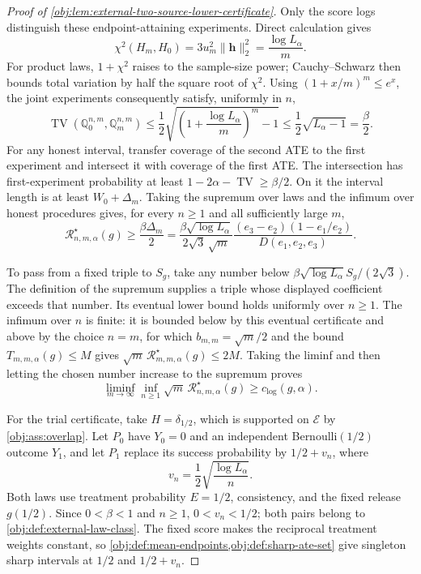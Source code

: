 \documentclass[11pt]{article}
\begin{document}
\begin{proof}[Proof of \cref{obj:lem:external-two-source-lower-certificate}]
Only the score logs distinguish these endpoint-attaining experiments. Direct calculation gives
\[
\chi^2(H_m,H_0)
=3u_m^2\|\mathbf h\|_2^2
=\frac{\log L_\alpha}{m}.
\]
For product laws, \(1+\chi^2\) raises to the sample-size power; Cauchy--Schwarz then bounds total variation by half the square root of \(\chi^2\). Using \((1+x/m)^m\le e^x\), the joint experiments consequently satisfy, uniformly in \(n\),
\[
\operatorname{TV}(\mathbb Q_0^{n,m},\mathbb Q_m^{n,m})
\le\frac12
 \sqrt{\left(1+\frac{\log L_\alpha}{m}\right)^m-1}
\le\frac12\sqrt{L_\alpha-1}
=\frac{\beta}{2}.
\]
For any honest interval, transfer coverage of the second ATE to the first experiment and intersect it with coverage of the first ATE. The intersection has first-experiment probability at least
\(1-2\alpha-\operatorname{TV}\ge\beta/2\). On it the interval length is at least \(W_0+\Delta_m\). Taking the supremum over laws and the infimum over honest procedures gives, for every \(n\ge1\) and all sufficiently large \(m\),
\[
\mathcal R^\star_{n,m,\alpha}(g)
\ge\frac{\beta\Delta_m}{2}
=\frac{\beta\sqrt{\log L_\alpha}}{2\sqrt3\,\sqrt m}
  \frac{(e_3-e_2)(1-e_1/e_2)}
       {D(e_1,e_2,e_3)}.
\]

To pass from a fixed triple to \(S_g\), take any number below
\(\beta\sqrt{\log L_\alpha}S_g/(2\sqrt3)\). The definition of the supremum supplies a triple whose displayed coefficient exceeds that number. Its eventual lower bound holds uniformly over \(n\ge1\). The infimum over \(n\) is finite: it is bounded below by this eventual certificate and above by the choice \(n=m\), for which \(b_{m,m}=\sqrt m/2\) and the bound \(T_{m,m,\alpha}(g)\le M\) gives
\(\sqrt m\,\mathcal R^\star_{m,m,\alpha}(g)\le2M\). Taking the liminf and then letting the chosen number increase to the supremum proves
\[
\liminf_{m\to\infty}\inf_{n\ge1}
 \sqrt m\,\mathcal R^\star_{n,m,\alpha}(g)
\ge c_{\mathrm{log}}(g,\alpha).
\]

For the trial certificate, take \(H=\delta_{1/2}\), which is supported on \(\mathcal E\) by \cref{obj:ass:overlap}. Let \(P_0\) have \(Y_0=0\) and an independent Bernoulli\((1/2)\) outcome \(Y_1\), and let \(P_1\) replace its success probability by \(1/2+v_n\), where
\[
v_n=\frac12\sqrt{\frac{\log L_\alpha}{n}}.
\]
Both laws use treatment probability \(E=1/2\), consistency, and the fixed release \(g(1/2)\). Since \(0<\beta<1\) and \(n\ge1\), \(0<v_n<1/2\); both pairs belong to \cref{obj:def:external-law-class}. The fixed score makes the reciprocal treatment weights constant, so \cref{obj:def:mean-endpoints,obj:def:sharp-ate-set} give singleton sharp intervals at \(1/2\) and \(1/2+v_n\).


\end{proof}
\end{document}
